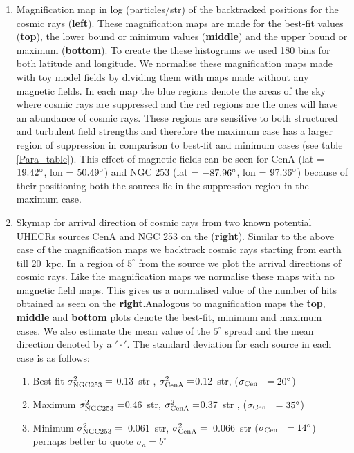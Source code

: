 \documentclass[usenatbib]{mnras}
\newcommand{\Andrew}[1]{\textcolor{dg}{#1}}
\begin{document}
\begin{enumerate}
    \item Magnification map in log (particles/str) of the backtracked positions for the cosmic rays (\textbf{left}). These magnification maps are made for the best-fit values (\textbf{top}), the lower bound or minimum values (\textbf{middle}) and the upper bound or maximum (\textbf{bottom}).
    To create the these histograms we used 180 bins for both latitude and longitude. 
    We normalise these magnification maps made with toy model fields by dividing them with maps made without any magnetic fields. In each map the blue regions denote the areas of the sky where cosmic rays are suppressed and the red regions are the ones will have an abundance of cosmic rays. These regions are sensitive to both structured and turbulent field strengths and therefore the maximum case has a larger region of suppression in comparison to best-fit and minimum cases (see table \ref{Para_table}). This effect of magnetic fields can be seen for CenA (lat = $\rm 19.42^{\circ}$, lon = $\rm 50.49^{\circ}$) and NGC 253 (lat = $\rm -87.96^{\circ}$, lon = $\rm 97.36^{\circ}$) because of their positioning both the sources lie in the suppression region in the maximum case.
    \item Skymap for arrival direction
    of cosmic rays from two known potential UHECRs sources CenA and NGC 253 on the (\textbf{right}). Similar to the above case of the magnification maps we backtrack cosmic rays starting from earth till 20~kpc. In a region of $5^{\circ}$ from the source we plot the arrival directions of cosmic rays. Like the magnification maps we normalise these maps with no magnetic field maps.  This gives us a normalised value of the number of hits obtained as seen on the \textbf{right}.Analogous to magnification maps the \textbf{top}, \textbf{middle} and \textbf{bottom} plots denote the best-fit, minimum and maximum cases. We also estimate the mean value of the $5^{\circ}$ spread and the mean direction denoted by a $'\cdot'$. 
    The standard deviation for each source in each case is as follows:
    \begin{enumerate}
        \item Best fit $\sigma^2_{\rm NGC 253} = $ 0.13~str , $\sigma^2_{\rm Cen A} = $0.12~str, {($\sigma_{\rm Cen~~}=20^{\circ}$)}
        \item Maximum $\sigma^2_{\rm NGC 253} = $0.46~str, $\sigma^2_{\rm Cen A} = $0.37~str , {($\sigma_{\rm Cen~~}=35^{\circ}$)}
        \item Minimum $\sigma^2_{\rm NGC 253} = $~0.061~str, $\sigma^2_{\rm Cen A} = $~0.066~str \Andrew{($\sigma_{\rm Cen~~}=14^{\circ}$)}\newline
        \Andrew{perhaps better to quote $\sigma_{a}= b^{\circ}$}
    \end{enumerate}


\end{enumerate}
\end{document}

